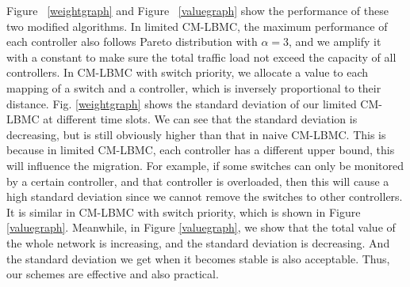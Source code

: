 Figure ~\ref{weightgraph} and Figure ~\ref{valuegraph} show the performance of these two modified algorithms. In limited CM-LBMC, the maximum performance of each controller also follows Pareto distribution with $\alpha=3$, and we amplify it with a constant to make sure the total traffic load not exceed the capacity of all controllers. In CM-LBMC with switch priority, we allocate a value to each mapping of a switch and a controller, which is inversely proportional to their distance. Fig. \ref{weightgraph} shows the standard deviation of our limited CM-LBMC at different time slots. We can see that the standard deviation is decreasing, but is still obviously higher than that in naive CM-LBMC. This is because in limited CM-LBMC, each controller has a different upper bound, this will influence the migration. For example, if some switches can only be monitored by a certain controller, and that controller is overloaded, then this will cause a high standard deviation since we cannot remove the switches to other controllers. It is similar in CM-LBMC with switch priority, which is shown in Figure \ref{valuegraph}. Meanwhile, in Figure \ref{valuegraph}, we show that the total value of the whole network is increasing, and the standard deviation is decreasing. And the standard deviation we get when it becomes stable is also acceptable. Thus, our schemes are effective and also practical.
